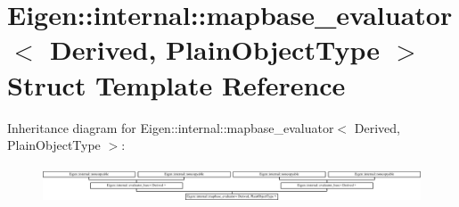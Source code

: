 \hypertarget{struct_eigen_1_1internal_1_1mapbase__evaluator}{}\section{Eigen\+:\+:internal\+:\+:mapbase\+\_\+evaluator$<$ Derived, Plain\+Object\+Type $>$ Struct Template Reference}
\label{struct_eigen_1_1internal_1_1mapbase__evaluator}
Inheritance diagram for Eigen\+:\+:internal\+:\+:mapbase\+\_\+evaluator$<$ Derived, Plain\+Object\+Type $>$\+:\begin{figure}[H]
\begin{center}
\leavevmode
\includegraphics[height=1.085271cm]{struct_eigen_1_1internal_1_1mapbase__evaluator}
\end{center}
\end{figure}
